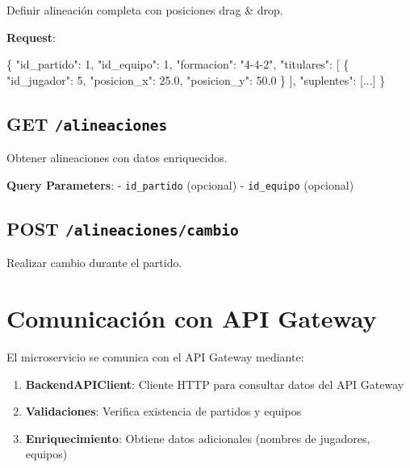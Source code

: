 \documentclass[
  spanish,
  11pt,
  letterpaper,
]{book}
\newenvironment{Shaded}{\begin{snugshade}}{\end{snugshade}}
\newcommand{\DataTypeTok}[1]{\textcolor[rgb]{0.68,0.00,0.00}{#1}}
\newcommand{\DecValTok}[1]{\textcolor[rgb]{0.68,0.00,0.00}{#1}}
\newcommand{\ErrorTok}[1]{\textcolor[rgb]{0.68,0.00,0.00}{#1}}
\newcommand{\FloatTok}[1]{\textcolor[rgb]{0.68,0.00,0.00}{#1}}
\newcommand{\FunctionTok}[1]{\textcolor[rgb]{0.28,0.35,0.67}{#1}}
\newcommand{\OtherTok}[1]{\textcolor[rgb]{0.00,0.23,0.31}{#1}}
\newcommand{\StringTok}[1]{\textcolor[rgb]{0.13,0.47,0.30}{#1}}
\providecommand{\tightlist}{%
  \setlength{\itemsep}{0pt}\setlength{\parskip}{0pt}}
\begin{document}
Definir alineación completa con posiciones drag \& drop.

\textbf{Request}:

\begin{Shaded}
\begin{Highlighting}[]
\FunctionTok{\{}
  \DataTypeTok{"id\_partido"}\FunctionTok{:} \DecValTok{1}\FunctionTok{,}
  \DataTypeTok{"id\_equipo"}\FunctionTok{:} \DecValTok{1}\FunctionTok{,}
  \DataTypeTok{"formacion"}\FunctionTok{:} \StringTok{"4{-}4{-}2"}\FunctionTok{,}
  \DataTypeTok{"titulares"}\FunctionTok{:} \OtherTok{[}
    \FunctionTok{\{}
      \DataTypeTok{"id\_jugador"}\FunctionTok{:} \DecValTok{5}\FunctionTok{,}
      \DataTypeTok{"posicion\_x"}\FunctionTok{:} \FloatTok{25.0}\FunctionTok{,}
      \DataTypeTok{"posicion\_y"}\FunctionTok{:} \FloatTok{50.0}
    \FunctionTok{\}}
  \OtherTok{]}\FunctionTok{,}
  \DataTypeTok{"suplentes"}\FunctionTok{:} \OtherTok{[}\ErrorTok{...}\OtherTok{]}
\FunctionTok{\}}
\end{Highlighting}
\end{Shaded}

\subsection{\texorpdfstring{GET
\texttt{/alineaciones}}{GET /alineaciones}}\label{get-alineaciones}

Obtener alineaciones con datos enriquecidos.

\textbf{Query Parameters}: - \texttt{id\_partido} (opcional) -
\texttt{id\_equipo} (opcional)

\subsection{\texorpdfstring{POST
\texttt{/alineaciones/cambio}}{POST /alineaciones/cambio}}\label{post-alineacionescambio}

Realizar cambio durante el partido.

\section{Comunicación con API
Gateway}\label{comunicaciuxf3n-con-api-gateway}

El microservicio se comunica con el API Gateway mediante:

\begin{enumerate}
\def\labelenumi{\arabic{enumi}.}
\tightlist
\item
  \textbf{BackendAPIClient}: Cliente HTTP para consultar datos del API
  Gateway
\item
  \textbf{Validaciones}: Verifica existencia de partidos y equipos
\item
  \textbf{Enriquecimiento}: Obtiene datos adicionales (nombres de
  jugadores, equipos)
\end{enumerate}
\end{document}
